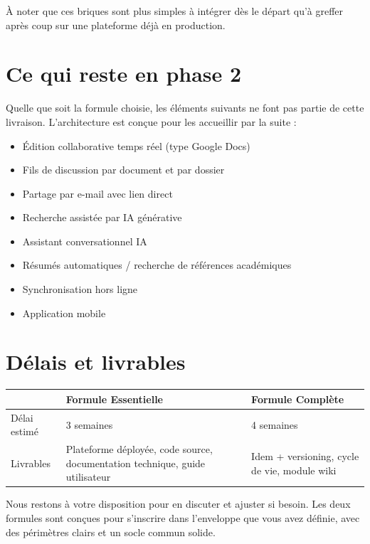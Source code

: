 \documentclass[a4paper,12pt,french]{article}
\begin{document}
À noter que ces briques sont plus simples à intégrer dès le départ qu'à greffer après coup sur une plateforme déjà en production.

\newpage
\section{Ce qui reste en phase 2}

Quelle que soit la formule choisie, les éléments suivants ne font pas partie de cette livraison. L'architecture est conçue pour les accueillir par la suite :

\begin{itemize}[leftmargin=1.5em]
  \item Édition collaborative temps réel (type Google Docs)
  \item Fils de discussion par document et par dossier
  \item Partage par e-mail avec lien direct
  \item Recherche assistée par IA générative
  \item Assistant conversationnel IA
  \item Résumés automatiques / recherche de références académiques
  \item Synchronisation hors ligne
  \item Application mobile
\end{itemize}

\section{Délais et livrables}

\begin{tabularx}{\textwidth}{l X X}
\toprule
& \textbf{Formule Essentielle} & \textbf{Formule Complète} \\
\midrule
Délai estimé & 3 semaines & 4 semaines \\
\addlinespace
Livrables & Plateforme déployée, code source, documentation technique, guide utilisateur & Idem + versioning, cycle de vie, module wiki \\
\bottomrule
\end{tabularx}

\vspace{1.5em}

Nous restons à votre disposition pour en discuter et ajuster si besoin. Les deux formules sont conçues pour s'inscrire dans l'enveloppe que vous avez définie, avec des périmètres clairs et un socle commun solide.
\end{document}

